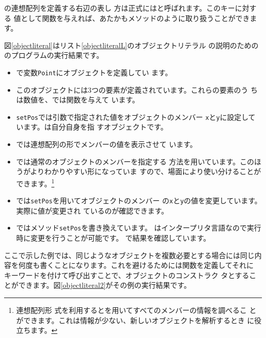 \JS の連想配列を定義する右辺の表し
方は正式にはと呼ばれます。このキーに対する
値として関数を与えれば、あたかもメソッドのように取り扱うことができます。

図\ref{objectliteral}はリスト\ref{objectliteralL}のオブジェクトリテラル
の説明のための\JS のプログラムの実行結果です。


\begin{itemize}
 \item {}で変数\texttt{Point}にオブジェクトを定義してい
       ます。
 \item このオブジェクトには3つの要素が定義されています。これらの要素のう
       ちは数値を、では関数を与えて
       います。
 \item \texttt{setPos}では引数で指定された値をオブジェクトのメンバー
       \texttt{x}と\texttt{y}に設定しています。は自分自身を指
       すオブジェクトです。
 \item {}では連想配列の形でメンバーの値を表示させて
       います。
 \item {}では通常のオブジェクトのメンバーを指定する
       方法を用いています。このほうがよりわかりやすい形になっていま
       すので、場面により使い分けることができます。\footnote{連想配列形
       式を利用するとを用いてすべてのメンバーの情報を調べるこ
       とができます。これは情報が少ない、新しいオブジェクトを解析するとき
       に役立ちます。}
 \item {}では\texttt{setPos}を用いてオブジェクトのメンバー
       の\texttt{x}と\texttt{y}の値を変更しています。実際に値が変更され
       ているのが確認できます。
 \item {}ではメソッド\texttt{setPos}を書き換えています。
       \JS はインタープリタ言語なので実行時に変更を行うことが可能です。
       で結果を確認しています。       
\end{itemize}
ここで示した例では、同じようなオブジェクトを複数必要とする場合には同じ内
容を何度も書くことになります。これを避けるためには関数を定義してそれに
 キーワードを付けて呼び出すことで、オブジェクトのコンストラク
タとすることができます。図\ref{objectliteral2}がその例の実行結果です。

